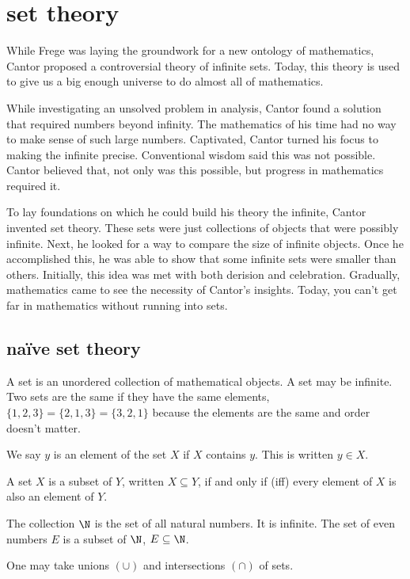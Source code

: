 \message{ !name(truth.tex)}\documentclass{scrbook}
\begin{document}
\chapter[Set theory]{set theory}
While Frege was laying the groundwork for a new ontology of mathematics, Cantor proposed a controversial theory of infinite sets. Today, this theory is used to give us a big enough universe to do almost all of mathematics.

While investigating an unsolved problem in analysis, Cantor found a solution that required numbers beyond infinity. 
The mathematics of his time had no way to make sense of such large numbers. Captivated, Cantor turned his focus to making the infinite precise. Conventional wisdom said this was not possible. Cantor believed that, not only was this possible, but progress in mathematics required it. 

To lay foundations on which he could build his theory the infinite, Cantor invented set theory. These sets were just collections of objects that were possibly infinite. Next, he looked for a way to compare the size of infinite objects. Once he accomplished this, he was able to show that some infinite sets were smaller than others. Initially, this idea was met with both derision and celebration. Gradually, mathematics came to see the necessity of Cantor's insights. Today, you can't get far in mathematics without running into sets. 
\section[Naïve set theory]{naïve set theory}
\begin{defn}
  A set is an unordered collection of mathematical objects. A set may be infinite. Two sets are the same if they have the same elements, \eg $\{1,2,3\}=\{2,1,3\}=\{3,2,1\}$ because the elements are the same and order doesn't matter. 
\end{defn}
\begin{defn}[member]
  We say $y$ is an element of the set $X$ if $X$ contains $y$. This is written $y\in X$.  
\end{defn}
\begin{defn}
  A set $X$ is a subset of $Y$, written $X\subseteq Y$, if and only if (iff) every element of $X$ is also an element of $Y$. 
\end{defn}
\begin{example}
  The collection $\N$ is the set of all natural numbers. It is infinite. The set of even numbers $E$ is a subset of $\N$, \ie $E\subseteq \N$. 
\end{example}
One may take unions $(\cup)$ and intersections $(\cap)$ of sets. 
\end{document}
